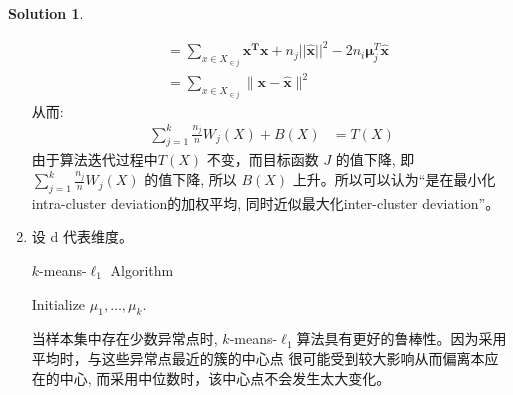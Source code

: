 \documentclass[a4paper,UTF8]{article}
\numberwithin{equation}{section}
\theoremstyle{definition}
\newtheorem*{solution}{Solution}
\begin{document}
\begin{solution}
\begin{enumerate}[(1)]
\begin{equation}
\begin{split}
  &= \sum_{x\in X_{\in j}}  {\mathbf{x^Tx}} + n_j ||\hat {\mathbf x} || ^ 2 - 2 n_i \boldsymbol \mu_j^T\hat {\mathbf x } \\
  &= \sum_{x \in X_{\in j}} \lVert \mathbf x - \hat {\mathbf x}\rVert^2 
   \end{split} 
\end{equation}
从而:
  \begin{equation}
 \begin{split}
 \sum_{j=1}^k  \frac{ n_j}{n} W_j(X) + B(X)  &=   T(X)
    \end{split}
\end{equation}
由于算法迭代过程中$ T(X)$ 不变，而目标函数 $J$ 的值下降, 即  $ \sum_{j=1}^k  \frac{ n_j}{n} W_j(X) $ 的值下降, 所以 $B(X)$ 上升。所以可以认为“是在最小化intra-cluster deviation的加权平均, 同时近似最大化inter-cluster deviation”。
\item %
设 d 代表维度。
\begin{algorithm}[] 
\label{algo:kmeans-l1}
\caption{$k$-means-$\ell_1$ Algorithm}
\setcounter{AlgoLine}{0}
Initialize $\mu_1, \ldots, \mu_k$.\\
\end{algorithm}
当样本集中存在少数异常点时, $k$-means-$\ell_1$算法具有更好的鲁棒性。因为采用平均时，与这些异常点最近的簇的中心点 很可能受到较大影响从而偏离本应在的中心, 而采用中位数时，该中心点不会发生太大变化。
\end{enumerate}
\end{solution}


\newpage %
\end{document}
